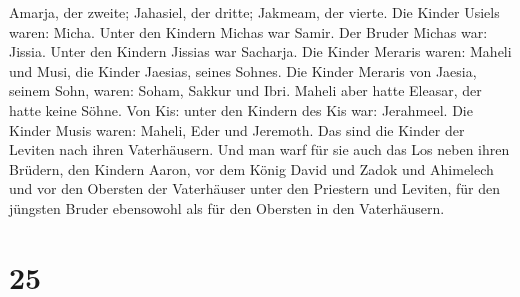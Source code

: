 Amarja, der zweite; Jahasiel, der dritte; Jakmeam, der vierte.
 Die Kinder Usiels waren: Micha. Unter den Kindern Michas
war Samir.  Der Bruder Michas war: Jissia. Unter den
Kindern Jissias war Sacharja.  Die Kinder Meraris waren:
Maheli und Musi, die Kinder Jaesias, seines Sohnes.  Die
Kinder Meraris von Jaesia, seinem Sohn, waren: Soham, Sakkur und Ibri.
 Maheli aber hatte Eleasar, der hatte keine Söhne.
 Von Kis: unter den Kindern des Kis war: Jerahmeel.
 Die Kinder Musis waren: Maheli, Eder und Jeremoth. Das
sind die Kinder der Leviten nach ihren Vaterhäusern.  Und
man warf für sie auch das Los neben ihren Brüdern, den Kindern Aaron,
vor dem König David und Zadok und Ahimelech und vor den Obersten der
Vaterhäuser unter den Priestern und Leviten, für den jüngsten Bruder
ebensowohl als für den Obersten in den Vaterhäusern.

\hypertarget{section-24}{%
\section{25}\label{section-24}}


